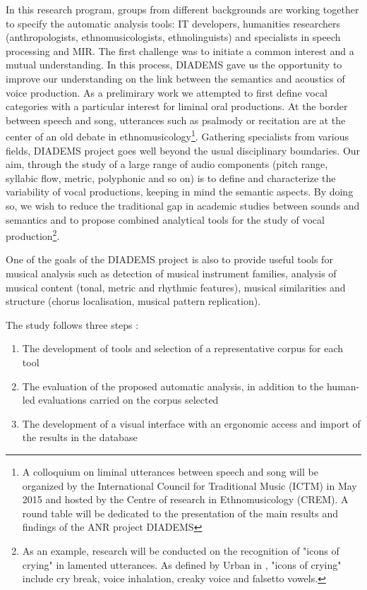 \documentclass{sig-alternate}
\begin{document}
In this research program, groups from different backgrounds are working together to specify the automatic analysis tools:  IT developers, humanities researchers (anthropologists, ethnomusicologists, ethnolinguists) and specialists in speech processing and MIR. The first challenge was to initiate a common interest and a mutual understanding. In this process, DIADEMS gave us the opportunity  to improve our understanding on the link between the semantics and acoustics of voice production. As a prelimirary work we attempted to first define vocal categories with a particular interest for liminal oral productions. At the border between speech and song, utterances such as psalmody or recitation are at the center of an old debate in ethnomusicology\footnote{A colloquium on liminal utterances between speech and song will be organized by the International Council for Traditional Music (ICTM) in May 2015 and hosted by the Centre of research in Ethnomusicology (CREM). A round table will be dedicated to the presentation of the main results and findings of the ANR project DIADEMS}. Gathering specialists from various fields, DIADEMS project goes well beyond the usual disciplinary boundaries. Our aim, through the study of a large range of audio components (pitch range, syllabic flow, metric, polyphonic and so on) is to define and characterize the variability of vocal productions, keeping in mind the semantic aspects. By doing so, we wish to reduce the traditional gap in academic studies between sounds and semantics and to propose combined analytical tools for the study of vocal production\footnote{As an example, research will be conducted on the recognition of "icons of crying" 
in lamented utterances. As defined by Urban in \cite{Urban88}, "icons of crying" include cry break, voice inhalation, creaky voice and falsetto vowels.}. 

One of the goals of the DIADEMS project is also to provide useful tools for musical analysis such as detection of musical instrument families, analysis of musical content (tonal, metric and rhythmic features), musical similarities and structure (chorus localisation, musical pattern replication).

The study follows three steps : 
\begin{enumerate}
\item The development of tools and selection of a representative corpus
  for each tool
\item The evaluation of the proposed automatic analysis, in addition to
  the human-led evaluations carried on the corpus selected
\item The development of a visual interface with an ergonomic access and
  import of the results in the database
\end{enumerate}
\end{document}
